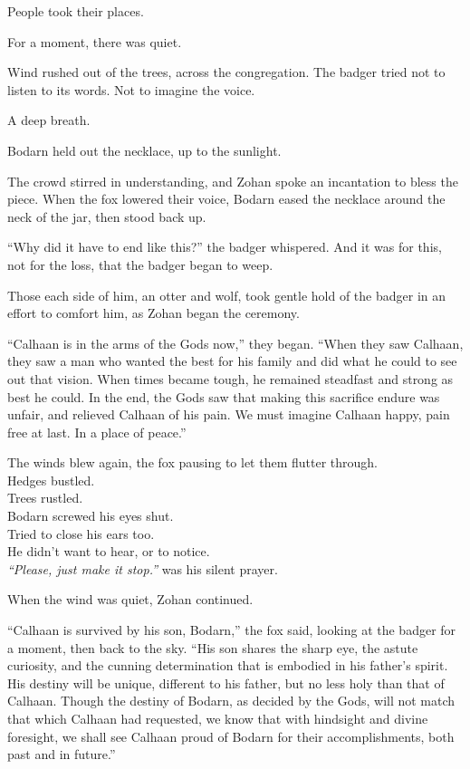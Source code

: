 People took their places.

For a moment, there was quiet.

Wind rushed out of the trees, across the congregation. The badger tried not to listen to its words. Not to imagine the voice.

A deep breath.

Bodarn held out the necklace, up to the sunlight.

The crowd stirred in understanding, and Zohan spoke an incantation to bless the piece. When the fox lowered their voice, Bodarn eased the necklace around the neck of the jar, then stood back up.

``Why did it have to end like this?'' the badger whispered. And it was for this, not for the loss, that the badger began to weep.

Those each side of him, an otter and wolf, took gentle hold of the badger in an effort to comfort him, as Zohan began the ceremony.

``Calhaan is in the arms of the Gods now,'' they began. ``When they saw Calhaan, they saw a man who wanted the best for his family and did what he could to see out that vision. When times became tough, he remained steadfast and strong as best he could. In the end, the Gods saw that making this sacrifice endure was unfair, and relieved Calhaan of his pain. We must imagine Calhaan happy, pain free at last. In a place of peace.''

The winds blew again, the fox pausing to let them flutter through.\\
Hedges bustled.\\
Trees rustled.\\
Bodarn screwed his eyes shut.\\
Tried to close his ears too.\\
He didn't want to hear, or to notice.\\
\emph{``Please, just make it stop.''} was his silent prayer.

When the wind was quiet, Zohan continued.

``Calhaan is survived by his son, Bodarn,'' the fox said, looking at the badger for a moment, then back to the sky. ``His son shares the sharp eye, the astute curiosity, and the cunning determination that is embodied in his father's spirit. His destiny will be unique, different to his father, but no less holy than that of Calhaan. Though the destiny of Bodarn, as decided by the Gods, will not match that which Calhaan had requested, we know that with hindsight and divine foresight, we shall see Calhaan proud of Bodarn for their accomplishments, both past and in future.''

